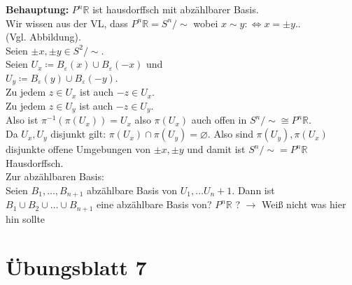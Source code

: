\begin{problem}[3b]
  \textbf{Behauptung:} \( P^n\mathbb{R} \) ist hausdorffsch mit abzählbarer Basis. \\
  Wir wissen aus der VL, dass \( P^n\mathbb{R} = S^n / \sim \) wobei \( x \sim y :\Leftrightarrow x = \pm y. \). \\
  (Vgl. Abbildung). \\
  Seien \( \pm x, \pm y \in S^2 / \sim \). \\
  Seien \( U_x \coloneqq B_\varepsilon(x) \cup B_\varepsilon(-x) \) und \\
  \( U_y \coloneqq B_\varepsilon(y) \cup B_\varepsilon(-y) \). \\
  Zu jedem \( z \in U_x \) ist auch \( -z \in U_x \). \\
  Zu jedem \( z \in U_y \) ist auch \( -z \in U_y \). \\
  Also ist \( \pi^{-1} (\pi(U_x)) = U_x \) also \( \pi(U_x) \) auch offen in \( S^n / \sim \cong P^n\mathbb{R} \). \\
  Da \( U_x, U_y \) disjunkt gilt: \( \pi(U_x) \cap \pi(U_y) = \varnothing \). Also sind \( \pi(U_y), \pi(U_x) \) disjunkte offene Umgebungen von \( \pm x, \pm y \) und damit ist \( S^n / \sim = P^n\mathbb{R} \) Hausdorffsch. \\
  Zur abzählbaren Basis: \\
  Seien \( B_1, \dots, B_{n+1} \) abzählbare Basis von \( U_1, \dots U_n+1 \). Dann ist \( B_1 \cup B_2 \cup \dots \cup B_{n+1} \) eine abzählbare Basis von? \( P^n\mathbb{R} \) \quad? \( \to \) Weiß nicht was hier hin sollte %
\end{problem}



% 
\section{Übungsblatt 7}

